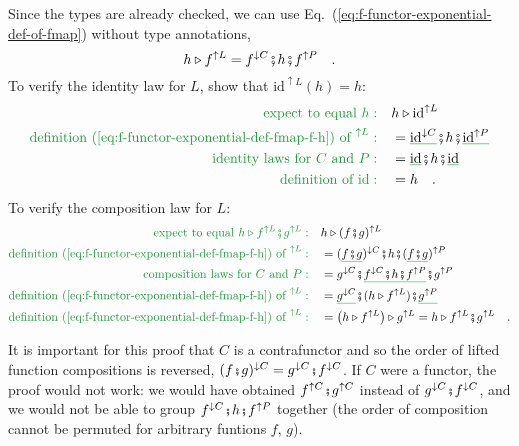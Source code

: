 Since the types are already checked, we can use Eq.~(\ref{eq:f-functor-exponential-def-of-fmap})
without type annotations,
\begin{equation}
h\triangleright f^{\uparrow L}=f^{\downarrow C}\bef h\bef f^{\uparrow P}\quad.\label{eq:f-functor-exponential-def-fmap-f-h}
\end{equation}
To verify the identity law for $L$, show that $\text{id}^{\uparrow L}(h)=h$:
\begin{align*}
{\color{greenunder}\text{expect to equal }h:}\quad & h\triangleright\text{id}^{\uparrow L}\\
{\color{greenunder}\text{definition (\ref{eq:f-functor-exponential-def-fmap-f-h}) of }^{\uparrow L}:}\quad & =\gunderline{\text{id}^{\downarrow C}}\bef h\bef\gunderline{\text{id}^{\uparrow P}}\\
{\color{greenunder}\text{identity laws for }C\text{ and }P:}\quad & =\gunderline{\text{id}}\bef h\bef\gunderline{\text{id}}\\
{\color{greenunder}\text{definition of }\text{id}:}\quad & =h\quad.
\end{align*}
To verify the composition law for $L$:
\begin{align*}
{\color{greenunder}\text{expect to equal }h\triangleright f^{\uparrow L}\bef g^{\uparrow L}:}\quad & h\triangleright(f\bef g)^{\uparrow L}\\
{\color{greenunder}\text{definition (\ref{eq:f-functor-exponential-def-fmap-f-h}) of }^{\uparrow L}:}\quad & =(\gunderline{f\bef g})^{\downarrow C}\bef h\bef(\gunderline{f\bef g})^{\uparrow P}\\
{\color{greenunder}\text{composition laws for }C\text{ and }P:}\quad & =g^{\downarrow C}\bef\gunderline{f^{\downarrow C}\bef h\bef f^{\uparrow P}}\bef g^{\uparrow P}\\
{\color{greenunder}\text{definition (\ref{eq:f-functor-exponential-def-fmap-f-h}) of }^{\uparrow L}:}\quad & =\gunderline{g^{\downarrow C}}\bef(h\triangleright f^{\uparrow L})\bef\gunderline{g^{\uparrow P}}\\
{\color{greenunder}\text{definition (\ref{eq:f-functor-exponential-def-fmap-f-h}) of }^{\uparrow L}:}\quad & =\left(h\triangleright f^{\uparrow L}\right)\triangleright g^{\uparrow L}=h\triangleright f^{\uparrow L}\bef g^{\uparrow L}\quad.
\end{align*}

It is important for this proof that $C$ is a contrafunctor and so
the order of lifted function compositions is reversed, $(f\bef g)^{\downarrow C}=g^{\downarrow C}\bef f^{\downarrow C}$.
If $C$ were a functor, the proof would not work: we would have obtained
$f^{\uparrow C}\bef g^{\uparrow C}$ instead of $g^{\downarrow C}\bef f^{\downarrow C}$,
and we would not be able to group $f^{\downarrow C}\bef h\bef f^{\uparrow P}$
together (the order of composition cannot be permuted for arbitrary
funtions $f$, $g$).

